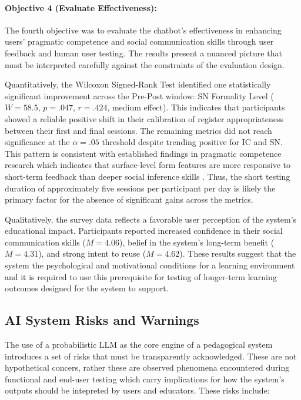 \paragraph{Objective 4 (Evaluate Effectiveness):} 

The fourth objective was to evaluate the chatbot's effectiveness in enhancing 
users' pragmatic competence and social communication skills through user 
feedback and human user testing. The results present a nuanced picture that 
must be interpreted carefully against the constraints of the evaluation design.

Quantitatively, the Wilcoxon Signed-Rank Test identified one statistically 
significant improvement across the Pre-Post window: SN Formality Level 
($W = 58.5$, $p = .047$, $r = .424$, medium effect). This indicates that 
participants showed a reliable positive shift in their calibration of register 
appropriateness between their first and final sessions. The remaining metrics did not reach 
significance at the $\alpha = .05$ threshold despite trending positive for IC and SN. This pattern is consistent with 
established findings in pragmatic competence research which indicates that 
surface-level form features are more responsive to short-term feedback than deeper social inference skills 
\cite{house1996, kasper1996}. Thus, the short testing duration of approximately 
five sessions per participant per day is likely the primary factor for the absence of significant gains across the metrics.

Qualitatively, the survey data reflects a favorable user perception of the 
system's educational impact. Participants reported increased confidence in 
their social communication skills ($M = 4.06$), belief in the system's 
long-term benefit ($M = 4.31$), and strong intent to reuse ($M = 4.62$). 
These results suggest that the system the psychological and motivational conditions for a learning environment and it is
required to use this prerequisite for testing of longer-term learning outcomes designed for the system to support.


\subsection{AI System Risks and Warnings}

The use of a probabilistic LLM as the core engine of a pedagogical system introduces a set of risks that must be transparently acknowledged. These are not
hypothetical concers, rather these are observed phenomena encountered during functional and end-user testing which carry implications for how the system's outputs
should be intepreted by users and educators. These risks include:

